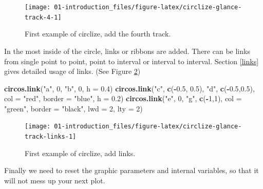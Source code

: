 \documentclass[]{book}
\newenvironment{Shaded}{\begin{snugshade}}{\end{snugshade}}
\newcommand{\KeywordTok}[1]{\textcolor[rgb]{0.13,0.29,0.53}{\textbf{#1}}}
\newcommand{\DataTypeTok}[1]{\textcolor[rgb]{0.13,0.29,0.53}{#1}}
\newcommand{\DecValTok}[1]{\textcolor[rgb]{0.00,0.00,0.81}{#1}}
\newcommand{\FloatTok}[1]{\textcolor[rgb]{0.00,0.00,0.81}{#1}}
\newcommand{\StringTok}[1]{\textcolor[rgb]{0.31,0.60,0.02}{#1}}
\newcommand{\OperatorTok}[1]{\textcolor[rgb]{0.81,0.36,0.00}{\textbf{#1}}}
\newcommand{\NormalTok}[1]{#1}
\begin{document}
\begin{figure}

{\centering \texttt{[image: 01-introduction\_files/figure-latex/circlize-glance-track-4-1]} 

}

\caption{First example of circlize, add the fourth track.}\label{fig:circlize-glance-track-4}
\end{figure}

In the most inside of the circle, links or ribbons are added. There can
be links from single point to point, point to interval or interval to
interval. Section \ref{links} gives detailed usage of links. (See Figure
\ref{fig:circlize-glance-track-links})

\begin{Shaded}
\begin{Highlighting}[]
\KeywordTok{circos.link}\NormalTok{(}\StringTok{"a"}\NormalTok{, }\DecValTok{0}\NormalTok{, }\StringTok{"b"}\NormalTok{, }\DecValTok{0}\NormalTok{, }\DataTypeTok{h =} \FloatTok{0.4}\NormalTok{)}
\KeywordTok{circos.link}\NormalTok{(}\StringTok{"c"}\NormalTok{, }\KeywordTok{c}\NormalTok{(}\OperatorTok{-}\FloatTok{0.5}\NormalTok{, }\FloatTok{0.5}\NormalTok{), }\StringTok{"d"}\NormalTok{, }\KeywordTok{c}\NormalTok{(}\OperatorTok{-}\FloatTok{0.5}\NormalTok{,}\FloatTok{0.5}\NormalTok{), }\DataTypeTok{col =} \StringTok{"red"}\NormalTok{,}
    \DataTypeTok{border =} \StringTok{"blue"}\NormalTok{, }\DataTypeTok{h =} \FloatTok{0.2}\NormalTok{)}
\KeywordTok{circos.link}\NormalTok{(}\StringTok{"e"}\NormalTok{, }\DecValTok{0}\NormalTok{, }\StringTok{"g"}\NormalTok{, }\KeywordTok{c}\NormalTok{(}\OperatorTok{-}\DecValTok{1}\NormalTok{,}\DecValTok{1}\NormalTok{), }\DataTypeTok{col =} \StringTok{"green"}\NormalTok{, }\DataTypeTok{border =} \StringTok{"black"}\NormalTok{, }\DataTypeTok{lwd =} \DecValTok{2}\NormalTok{, }\DataTypeTok{lty =} \DecValTok{2}\NormalTok{)}
\end{Highlighting}
\end{Shaded}

\begin{figure}

{\centering \texttt{[image: 01-introduction\_files/figure-latex/circlize-glance-track-links-1]} 

}

\caption{First example of circlize, add links.}\label{fig:circlize-glance-track-links}
\end{figure}

Finally we need to reset the graphic parameters and internal variables,
so that it will not mess up your next plot.
\end{document}
